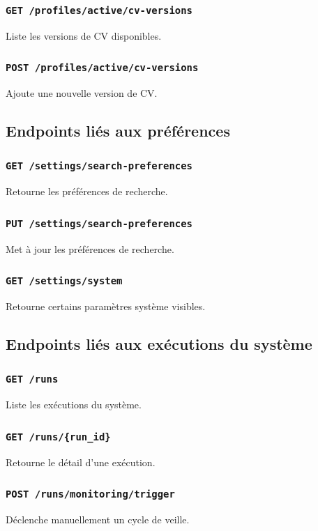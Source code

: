 \documentclass[11pt,a4paper]{article}
\begin{document}
\subsubsection{\texttt{GET /profiles/active/cv-versions}}
Liste les versions de CV disponibles.

\subsubsection{\texttt{POST /profiles/active/cv-versions}}
Ajoute une nouvelle version de CV.

\subsection{Endpoints liés aux préférences}

\subsubsection{\texttt{GET /settings/search-preferences}}
Retourne les préférences de recherche.

\subsubsection{\texttt{PUT /settings/search-preferences}}
Met à jour les préférences de recherche.

\subsubsection{\texttt{GET /settings/system}}
Retourne certains paramètres système visibles.

\subsection{Endpoints liés aux exécutions du système}

\subsubsection{\texttt{GET /runs}}
Liste les exécutions du système.

\subsubsection{\texttt{GET /runs/\{run\_id\}}}
Retourne le détail d’une exécution.

\subsubsection{\texttt{POST /runs/monitoring/trigger}}
Déclenche manuellement un cycle de veille.
\end{document}
